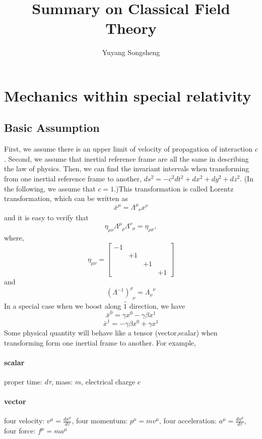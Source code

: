 \documentclass{article}
\author{Yuyang Songsheng}
\title{Summary on Classical Field Theory}
\begin{document}
\maketitle
\section{Mechanics within special relativity}
\subsection{Basic Assumption}
First, we assume there is an upper limit of velocity of propagation of interaction $c$. Second, we assume that inertial reference frame are all the same in describing the law of physics. Then, we can find the invariant intervals when transforming from one inertial reference frame to another, $ds^2 = -c^2 dt^2 + dx^2 + dy^2 + dz^2$. 
(In the following, we assume that $c=1$.)This transformation is called Lorentz transformation, which can be written as
\[\bar{x}^{\mu} = \Lambda^{\mu}_{\phantom{\mu}\nu} x^{\nu}\]
and it is easy to verify that
\[\eta_{\mu \nu} \Lambda^{\mu}_{\phantom{\mu}\rho} \Lambda^{\nu}_{\phantom{\nu}\sigma} = \eta_{\rho \sigma},\]
where,
\[\eta_{\mu \nu} = \left[ 
\begin{matrix} 
-1& & & \\ 
& +1 & & \\
& & +1 & \\
& & & +1
\end{matrix} 
\right]\]
and
\[(\Lambda^{-1})^{\rho}_{\phantom{\rho}\nu} = \Lambda_{\nu}^{\phantom{\mu}\nu}\]
In a special case when we boost along $\hat{1}$ direction, we have
\[\bar{x}^{0} = \gamma x^0 - \gamma \beta x^1\]
\[\bar{x}^{1} = -\gamma \beta x^0 + \gamma x^1\]
Some physical quantity will behave like a tensor (vector,scalar) when transforming form one inertial frame to another. For example,
\paragraph{scalar} proper time: $d \tau$, mass: $m$, electrical charge $e$
\paragraph{vector} four velocity: $v^{\mu} = \frac{dx^{\mu}}{d \tau}$, four momentum: $p^{\mu} = m v^{\mu}$, four acceleration: $a^{\mu} = \frac{du^{\mu}}{d \tau}$, four force: $f^{\mu} = m a^{\mu}$
\end{document}
